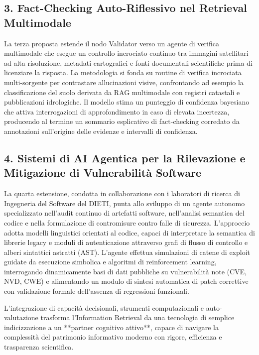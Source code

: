 \subsection{3. Fact-Checking Auto-Riflessivo nel Retrieval Multimodale}
La terza proposta estende il nodo Validator verso un agente di verifica multimodale che esegue un controllo incrociato continuo tra immagini satellitari ad alta risoluzione, metadati cartografici e fonti documentali scientifiche prima di licenziare la risposta. La metodologia si fonda su routine di verifica incrociata multi-sorgente per contrastare allucinazioni visive, confrontando ad esempio la classificazione del suolo derivata da RAG multimodale con registri catastali e pubblicazioni idrologiche. Il modello stima un punteggio di confidenza bayesiano che attiva interrogazioni di approfondimento in caso di elevata incertezza, producendo al termine un sommario esplicativo di fact-checking corredato da annotazioni sull'origine delle evidenze e intervalli di confidenza.

\subsection{4. Sistemi di AI Agentica per la Rilevazione e Mitigazione di Vulnerabilità Software}
La quarta estensione, condotta in collaborazione con i laboratori di ricerca di Ingegneria del Software del DIETI, punta allo sviluppo di un agente autonomo specializzato nell'audit continuo di artefatti software, nell'analisi semantica del codice e nella formulazione di contromisure contro falle di sicurezza. L'approccio adotta modelli linguistici orientati al codice, capaci di interpretare la semantica di librerie legacy e moduli di autenticazione attraverso grafi di flusso di controllo e alberi sintattici astratti (AST). L'agente effettua simulazioni di catene di exploit guidate da esecuzione simbolica e algoritmi di reinforcement learning, interrogando dinamicamente basi di dati pubbliche su vulnerabilità note (CVE, NVD, CWE) e alimentando un modulo di sintesi automatica di patch correttive con validazione formale dell'assenza di regressioni funzionali.

L'integrazione di capacità decisionali, strumenti computazionali e auto-valutazione trasforma l'Information Retrieval da una tecnologia di semplice indicizzazione a un **partner cognitivo attivo**, capace di navigare la complessità del patrimonio informativo moderno con rigore, efficienza e trasparenza scientifica.
